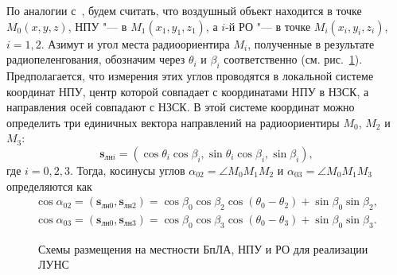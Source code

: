 \documentclass[../main.tex]{subfiles}
\begin{document}
По аналогии с~\cite{antennas}, будем считать, что воздушный объект находится в точке $M_0\left(x, y, z\right)$, НПУ "--- в $M_1\left(x_1, y_1, z_1\right)$, а $i$-й РО "--- в точке $M_i\left(x_i, y_i, z_i \right)$, $i = 1,2$. Азимут и угол места радиоориентира $M_i$, полученные в результате радиопеленгования, обозначим через $\theta_i$ и $\beta_i$ соответственно (см. рис.~\ref{fig:systems:pic1}). Предполагается, что измерения этих углов проводятся в локальной системе координат НПУ, центр которой совпадает с координатами НПУ в НЗСК, а направления осей совпадают с НЗСК. В этой системе координат можно определить три единичных вектора направлений на радиоориентиры $M_0$, $M_2$ и $M_3$:
\begin{equation*}
  \mathbf{s}_{\text{лн}i} = \left(\cos\theta_i \cos\beta_i, \sin\theta_i\cos\beta_i, \sin\beta_i\right),
\end{equation*}
где $i = 0, 2, 3$. Тогда, косинусы углов $\alpha_{02} = \angle M_0 M_1 M_2$ и $\alpha_{03} = \angle M_0 M_1 M_3$ определяются как
\begin{align*}
  \cos\alpha_{02} = \left(\mathbf{s}_{\text{лн}0}, \mathbf{s}_{\text{лн}2}\right) =
  \cos\beta_0 \cos\beta_2 \cos\left(\theta_0 - \theta_2\right) + \sin\beta_0 \sin\beta_2, \\
  \cos\alpha_{03} = \left(\mathbf{s}_{\text{лн}0}, \mathbf{s}_{\text{лн}3}\right) =
  \cos\beta_0 \cos\beta_3 \cos\left(\theta_0 - \theta_3\right) + \sin\beta_0 \sin\beta_3.
\end{align*}

\begin{figure}[htbp]
  \centering


  \caption{Схемы размещения на местности БпЛА, НПУ и РО для реализации ЛУНС}
  \label{fig:systems:pic1}
\end{figure}
\end{document}

